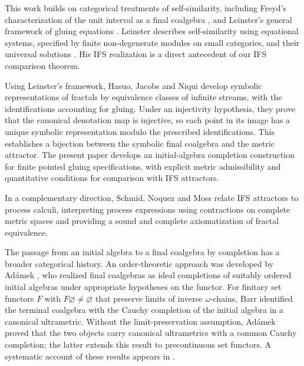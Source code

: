 \documentclass{sn-jnl}%
\theoremstyle{thmstyleone}%
\theoremstyle{thmstyletwo}%
\theoremstyle{thmstylethree}%
\begin{document}
This work builds on categorical treatments of self-similarity, including Freyd's characterization of the unit interval as a final coalgebra \cite{freyd:real}, and Leinster's general framework of gluing equations   \cite{Lein}. Leinster describes self-similarity using equational systems, specified by finite non-degenerate modules on small categories, and their universal solutions \cite[Definitions~2.8--2.9]{Lein}. His IFS realization   \cite[Example~10.11]{Lein} is a direct antecedent of our IFS comparison theorem. 

Using Leinster’s framework, Hasuo, Jacobs and Niqui \cite{coalge_representation} develop symbolic representations of fractals by equivalence classes of infinite streams, with the identifications accounting for gluing. Under an injectivity hypothesis, they prove that the canonical denotation map is injective, so each point in its image has a unique symbolic representation modulo the prescribed identifications. This establishes a bijection between the symbolic final coalgebra and the metric attractor. The present paper develops an initial-algebra completion construction for finite pointed gluing specifications, with explicit metric admissibility and quantitative conditions for comparison with IFS attractors.

In a complementary direction, Schmid, Noquez and Moss \cite{SchmidNoquezMoss2025} relate IFS attractors to process calculi, interpreting process expressions using contractions on complete metric spaces and providing a sound and complete axiomatization of fractal equivalence.

The passage from an initial algebra to a final coalgebra by completion has a broader categorical history. An order-theoretic approach was developed by Adámek \cite{Adamek2002Ideal}, who realized final coalgebras as ideal completions of suitably ordered initial algebras under appropriate hypotheses on the functor. For finitary set functors $F$ with $F\varnothing\neq\varnothing$ that preserve limits of inverse $\omega$-chains, Barr \cite{Bar} identified the terminal coalgebra with the Cauchy completion of the initial algebra in a canonical ultrametric. Without the limit-preservation assumption, Ad\'amek \cite{Adamek2019Completion,Adamek2021Completion} proved that the two objects carry canonical ultrametrics with a common Cauchy completion; the latter extends this result to precontinuous set functors.  A systematic account of these results appears in \cite[Chapter~13]{AMM}.
\end{document}
